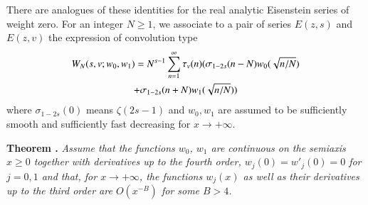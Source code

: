 There are analogues of these identities for the real analytic Eisenstein series of weight zero. For an integer $N\geqslant 1$, we associate to a pair of series $E(z,s)$ and $E(z,v)$ the expression of convolution type 
\begin{gather}
W_N(s,v; w_0, w_1) = N^{s-1} \sum\limits^\infty_{n=1} \tau_v (n) (\sigma_{1-2s} (n-N)w_0(\sqrt{n/N})\\
+ \sigma_{1-2s} (n+N) w_1 (\sqrt{n/N})) \notag
\end{gather}
where $\sigma_{1-2s} (0)$ means $\zeta(2s-1)$ and $w_0, w_1$ are assumed to be sufficiently smooth and sufficiently fast decreasing for $x \to + \infty$.

\medskip
\noindent
{\bfseries Theorem .\label{art7-thm9}} 
\textit{Assume that the functions $w_0$, $w_1$ are continuous on the semiaxis $x \geqslant 0$ together with derivatives up to the fourth order, $w_j (0) = w'_j(0) = 0$ for $j=0,1$ and that, for $x \to + \infty$, the functions $w_j(x)$ as well as their derivatives up to the third order are $O(x^{-B})$ for some $B>4$.}

